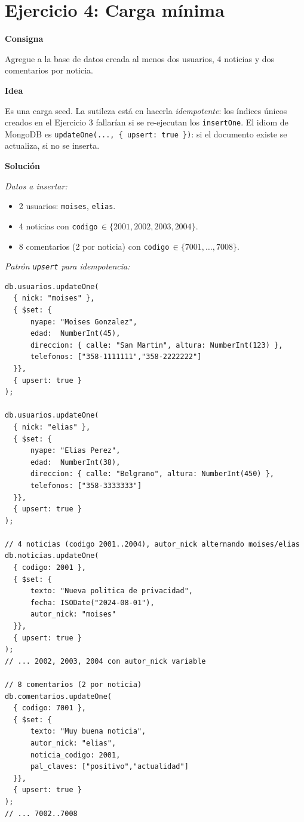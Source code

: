 \documentclass[11pt,a4paper]{article}
\newcommand{\itemcabecera}[1]{\noindent\textbf{#1}\par\medskip}
\newcommand{\bloqueConsigna}{\itemcabecera{Consigna}}
\newcommand{\bloqueIdea}{\itemcabecera{Idea}}
\newcommand{\bloqueSolucion}{\itemcabecera{Soluci\'on}}
\begin{document}
\section{Ejercicio 4: Carga mínima}

\bloqueConsigna

Agregue a la base de datos creada al menos dos usuarios, 4 noticias y dos comentarios por noticia.

\bloqueIdea

Es una carga seed. La sutileza está en hacerla \emph{idempotente}: los índices únicos creados en el Ejercicio 3 fallarían si se re-ejecutan los \texttt{insertOne}. El idiom de MongoDB es \texttt{updateOne(..., \{ upsert: true \})}: si el documento existe se actualiza, si no se inserta.

\bloqueSolucion

\textit{Datos a insertar:}

\begin{itemize}
    \item 2 usuarios: \texttt{moises}, \texttt{elias}.
    \item 4 noticias con \texttt{codigo}\,$\in\{2001,2002,2003,2004\}$.
    \item 8 comentarios (2 por noticia) con \texttt{codigo}\,$\in\{7001,\ldots,7008\}$.
\end{itemize}

\textit{Patrón \texttt{upsert} para idempotencia:}

\begin{lstlisting}
db.usuarios.updateOne(
  { nick: "moises" },
  { $set: {
      nyape: "Moises Gonzalez",
      edad:  NumberInt(45),
      direccion: { calle: "San Martin", altura: NumberInt(123) },
      telefonos: ["358-1111111","358-2222222"]
  }},
  { upsert: true }
);

db.usuarios.updateOne(
  { nick: "elias" },
  { $set: {
      nyape: "Elias Perez",
      edad:  NumberInt(38),
      direccion: { calle: "Belgrano", altura: NumberInt(450) },
      telefonos: ["358-3333333"]
  }},
  { upsert: true }
);

// 4 noticias (codigo 2001..2004), autor_nick alternando moises/elias
db.noticias.updateOne(
  { codigo: 2001 },
  { $set: {
      texto: "Nueva politica de privacidad",
      fecha: ISODate("2024-08-01"),
      autor_nick: "moises"
  }},
  { upsert: true }
);
// ... 2002, 2003, 2004 con autor_nick variable

// 8 comentarios (2 por noticia)
db.comentarios.updateOne(
  { codigo: 7001 },
  { $set: {
      texto: "Muy buena noticia",
      autor_nick: "elias",
      noticia_codigo: 2001,
      pal_claves: ["positivo","actualidad"]
  }},
  { upsert: true }
);
// ... 7002..7008
\end{lstlisting}
\end{document}
